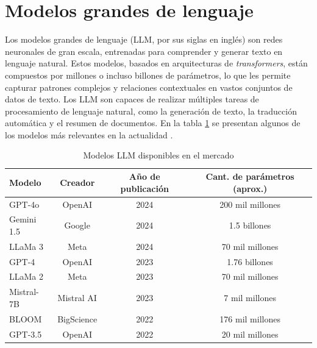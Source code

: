 \section{Modelos grandes de lenguaje}

Los modelos grandes de lenguaje (LLM, por sus siglas en inglés) son redes neuronales de gran escala, entrenadas 
para comprender y generar texto en lenguaje natural. Estos modelos, basados en arquitecturas de \textit{transformers}, 
están compuestos por millones o incluso billones de parámetros, lo que les permite capturar patrones complejos y 
relaciones contextuales en vastos conjuntos de datos de texto. Los LLM son capaces de realizar múltiples 
tareas de procesamiento de lenguaje natural, como la generación de texto, la traducción 
automática y el resumen de documentos. En la tabla \ref{tab:llms} se presentan 
algunos de los modelos más relevantes en la actualidad \citep{website:lifearchitect}.

\begin{table}[h]
	\centering
	\caption[Modelos LLM disponibles en el mercado]{Modelos LLM disponibles en el mercado}
	\begin{tabular}{l c c c}    
		\toprule
		\textbf{Modelo} 	 & \textbf{Creador} 	& \textbf{Año de publicación}  & \textbf{Cant. de parámetros (aprox.)}\\
		\midrule
		GPT-4o               & OpenAI 				& 2024                         & 200 mil millones\\		
		Gemini 1.5      	 & Google				& 2024                         & 1.5 billones\\
		LLaMa 3         	 & Meta				    & 2024                         & 70 mil millones\\
        GPT-4         	     & OpenAI				& 2023                         & 1.76 billones\\
        LLaMa 2         	 & Meta				    & 2023                         & 70 mil millones\\
        Mistral-7B         	 & Mistral AI		    & 2023                         & 7 mil millones\\
        BLOOM         	     & BigScience		    & 2022                         & 176 mil millones\\
        GPT-3.5         	 & OpenAI				& 2022                         & 20 mil millones\\
		\bottomrule
		\hline
	\end{tabular}
	\label{tab:llms}
\end{table}

